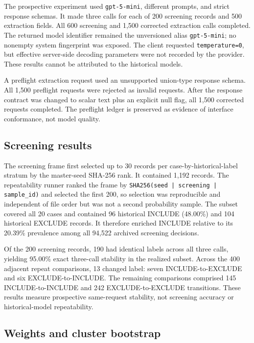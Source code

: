 \documentclass[acmsmall,anonymous,review]{acmart}
\begin{document}
The prospective experiment used \texttt{gpt-5-mini}, different prompts, and strict response schemas. It made three calls for each of 200 screening records and 500 extraction fields. All 600 screening and 1,500 corrected extraction calls completed. The returned model identifier remained the unversioned alias \texttt{gpt-5-mini}; no nonempty system fingerprint was exposed. The client requested \texttt{temperature=0}, but effective server-side decoding parameters were not recorded by the provider. These results cannot be attributed to the historical models.

A preflight extraction request used an unsupported union-type response schema. All 1,500 preflight requests were rejected as invalid requests. After the response contract was changed to scalar text plus an explicit null flag, all 1,500 corrected requests completed. The preflight ledger is preserved as evidence of interface conformance, not model quality.

\subsection{Screening results}

The screening frame first selected up to 30 records per case-by-historical-label stratum by the master-seed SHA-256 rank. It contained 1,192 records. The repeatability runner ranked the frame by \texttt{SHA256(seed | screening | sample\_id)} and selected the first 200, so selection was reproducible and independent of file order but was not a second probability sample. The subset covered all 20 cases and contained 96 historical INCLUDE (48.00\%) and 104 historical EXCLUDE records. It therefore enriched INCLUDE relative to its 20.39\% prevalence among all 94,522 archived screening decisions.

Of the 200 screening records, 190 had identical labels across all three calls, yielding 95.00\% exact three-call stability in the realized subset. Across the 400 adjacent repeat comparisons, 13 changed label: seven INCLUDE-to-EXCLUDE and six EXCLUDE-to-INCLUDE. The remaining comparisons comprised 145 INCLUDE-to-INCLUDE and 242 EXCLUDE-to-EXCLUDE transitions. These results measure prospective same-request stability, not screening accuracy or historical-model repeatability.

\subsection{Weights and cluster bootstrap}
\end{document}
